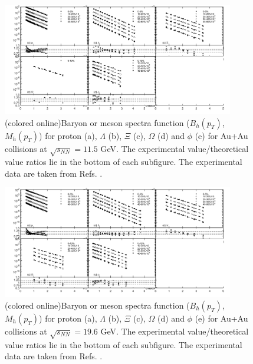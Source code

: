 \documentclass[twocolumn,aps,superscriptaddress,showpacs,nofootinbib,floatfix]{revtex4}
\begin{document}
\begin{figure}[pht]
		\includegraphics[width=0.9\textwidth]{pic3.png}
		\caption{(colored online)Baryon or meson spectra function ($B_h(p_T)$, $M_h(p_T)$) for proton (a), $\Lambda$ (b), $\Xi$ (c), $\Omega$ (d) and $\phi$ (e) for Au+Au collisions at $\sqrt{s_{NN}}=11.5$ GeV. The experimental value/theoretical value ratios lie in the bottom of each subfigure. The experimental data are taken from Refs. \cite{STAR:2019bjj,STAR:2017sal,STAR:2015vvs}.}
		\label{fig3}
\end{figure}

\begin{figure}[pht]
	\includegraphics[width=0.9\textwidth]{pic4.png}
	\caption{(colored online)Baryon or meson spectra function ($B_h(p_T)$, $M_h(p_T)$) for proton (a), $\Lambda$ (b), $\Xi$ (c), $\Omega$ (d) and $\phi$ (e) for Au+Au collisions at $\sqrt{s_{NN}}=19.6$ GeV. The experimental value/theoretical value ratios lie in the bottom of each subfigure. The experimental data are taken from Refs. \cite{STAR:2019bjj,STAR:2017sal,STAR:2015vvs}.}
	\label{fig4}
\end{figure}
\end{document}
